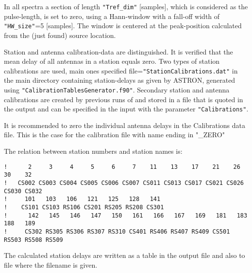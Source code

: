 In all spectra a section of length \verb!"Tref_dim"! [samples], which is considered as the pulse-length, is set to zero, using a Hann-window with a fall-off width of \verb!"HW_size"!=5 [samples]. The window is centered at the peak-position calculated from the (just found) source location.





Station and antenna calibration-data are distinguished. It is verified that the mean delay of all antennas in a station equals zero. Two types of station calibrations are used, main ones specified file=\verb!"StationCalibrations.dat"! in the main directory containing station-delays as given by ASTRON, generated using \verb!"CalibrationTablesGenerator.f90"!. Secondary station and antenna calibrations are created by previous runs of  and stored in a file that is quoted in the output and can be specified in the input with the parameter \verb!"Calibrations"!.

It is recommended to zero the individual antenna delays in the Calibrations data file. This is the case for the calibration file with name ending in "\_ZERO"

The relation between station numbers and station names is:

\begin{linenumbers}
\begin{verbatim}
!      2     3     4     5     6     7    11    13    17    21    26    30    32
!   CS002 CS003 CS004 CS005 CS006 CS007 CS011 CS013 CS017 CS021 CS026 CS030 CS032
!     101   103   106   121   125   128   141
!    CS101 CS103 RS106 CS201 RS205 RS208 CS301
!      142   145   146   147   150   161   166   167   169   181   183   188   189
!     CS302 RS305 RS306 RS307 RS310 CS401 RS406 RS407 RS409 CS501 RS503 RS508 RS509
\end{verbatim}
\end{linenumbers}

The calculated station delays are written as a table in the output file and also to file where the filename is given.





